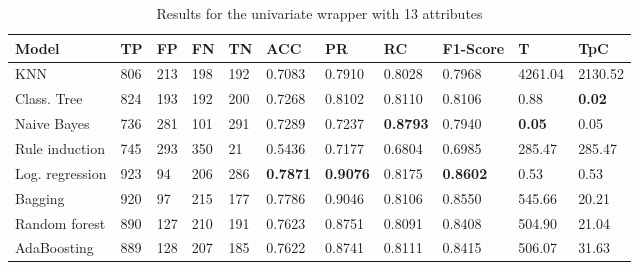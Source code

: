 \documentclass[a4paper,11pt]{article}
\begin{document}
\begin{table}
\centering
\begin{tabular}{|l|l|l|l|l|l|l|l|l|l|l|}
\hline

\textbf{Model} & \textbf{TP} & \textbf{FP} & \textbf{FN} & \textbf{TN} & \textbf{ACC} & \textbf{PR} & \textbf{RC} & \textbf{F1-Score} & \textbf{T} & \textbf{TpC} \\ \hline
KNN & 806 & 213 & 198 & 192 & 0.7083 & 0.7910 & 0.8028 & 0.7968 & 4261.04 & 2130.52 \\ \hline
Class. Tree & 824 & 193 & 192 & 200 & 0.7268 & 0.8102 & 0.8110 & 0.8106 & 0.88 & \textbf{0.02} \\ \hline
Naive Bayes & 736 & 281 & 101 & 291 & 0.7289 & 0.7237 & \textbf{0.8793} & 0.7940 & \textbf{0.05} & 0.05 \\ \hline
Rule induction & 745 & 293 & 350 & 21 & 0.5436 & 0.7177 & 0.6804 & 0.6985 & 285.47 & 285.47 \\ \hline
Log. regression & 923 & 94 & 206 & 286 & \textbf{0.7871} & \textbf{0.9076} & 0.8175 & \textbf{0.8602} & 0.53 & 0.53 \\ \hline
Bagging & 920 & 97 & 215 & 177 & 0.7786 & 0.9046 & 0.8106 & 0.8550 & 545.66 & 20.21 \\ \hline
Random forest & 890 & 127 & 210 & 191 & 0.7623 & 0.8751 & 0.8091 & 0.8408 & 504.90 & 21.04 \\ \hline
AdaBoosting & 889 & 128 & 207 & 185 & 0.7622 & 0.8741 & 0.8111 & 0.8415 & 506.07 & 31.63 \\ \hline

\end{tabular}
\caption{Results for the univariate wrapper with 13 attributes}
\label{class:w50u}
\end{table}
\end{document}

